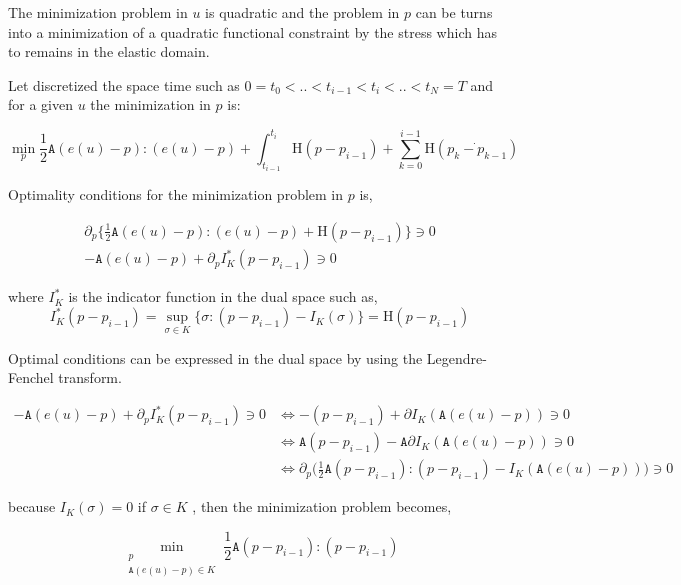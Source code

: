 \documentclass[10pt,oneside]{report}
\begin{document}
The minimization problem in $u$ is quadratic and the problem in $p$ can be turns into a minimization of a quadratic functional constraint by the stress which has to remains in the elastic domain.

Let discretized the space time such as $0=t_0<..<t_{i-1}<t_i<..<t_N=T$ and for a given $u$ the minimization in $p$ is:

$$\min_{p}   \frac{1}{2} \mathtt{A} (e(u)-p) :  (e(u)-p) + \int_{t_{i-1}}^{t_i} \mathrm{H} (p-p_{i-1}) + \sum_{k=0}^{i-1} \mathrm{H} (\dot{p_k-p_{k-1}}) $$

Optimality conditions for the minimization problem in $p$ is, 

\begin{equation}
\begin{split}
\partial_p \{  \frac{1}{2}\mathtt{A} (e(u)-p):(e(u)-p) + \mathrm{H}(p-p_{i-1}) \} \ni 0 \\
-\mathtt{A} (e(u)-p) + \partial_p I^*_K(p-p_{i-1}) \ni 0
\end{split}
\end{equation}

where $I^{*}_K$ is the indicator function in the dual space such as, $$I^*_K(p-p_{i-1})= \sup_{\sigma \in K} \{ \sigma:(p-p_{i-1}) - I_K(\sigma)  \} = \mathrm{H}(p-p_{i-1})$$


Optimal conditions can be expressed in the dual space by using the Legendre-Fenchel transform.


\begin{equation}
\begin{split}
-\mathtt{A} (e(u)-p) + \partial_p I^*_K(p-p_{i-1}) \ni 0 & \Leftrightarrow -(p-p_{i-1}) + \partial I_K(\mathtt{A} (e(u)-p)) \ni 0 \\
 & \Leftrightarrow   \mathtt{A}(p-p_{i-1}) - \mathtt{A}\partial I_K (\mathtt{A}(e(u)-p)) \ni 0 \\
& \Leftrightarrow  \partial_p \Big( \frac{1}{2}\mathtt{A}(p-p_{i-1}):(p-p_{i-1}) - I_K (\mathtt{A}(e(u)-p)) \Big) \ni 0
\end{split}
\end{equation}

because $I_K(\sigma) = 0$ if $\sigma \in K$ , then the minimization problem becomes,


$$ \min_{\substack{p \\ \mathtt{A}(e(u)-p) \in K}} \frac{1}{2}\mathtt{A} (p-p_{i-1}):(p-p_{i-1}) $$
\end{document}
